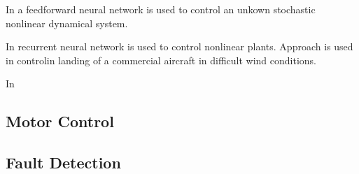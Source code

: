 \documentclass[conference]{IEEEtran}
\begin{document}
In \cite{milito1991nips} a feedforward neural network is used to control an unkown stochastic nonlinear dynamical system.

In \cite{lippmann1991nips} recurrent neural network is used to control nonlinear plants. Approach is used in controlin landing of a commercial aircraft in difficult wind conditions.

In \cite{}
\subsection{Motor Control}

\cite{yao2010adaline, nouri2008adaptive, aamir13pid, kumarawadu2010discrete-time, brdys1999dynamic, kim1991ICIECI, meng2016safety, Shao2017, alicmotor, zhang2017fault, silva2013fault, murphey2006fault, murphey2006model}

\subsection{Fault Detection}

\cite{meng2016safety, Shao2017, alicmotor, zhang2017fault, silva2013fault, murphey2006fault, murphey2006model, George2017qtr, marko1991nips, kim2005nips}



\end{document}
